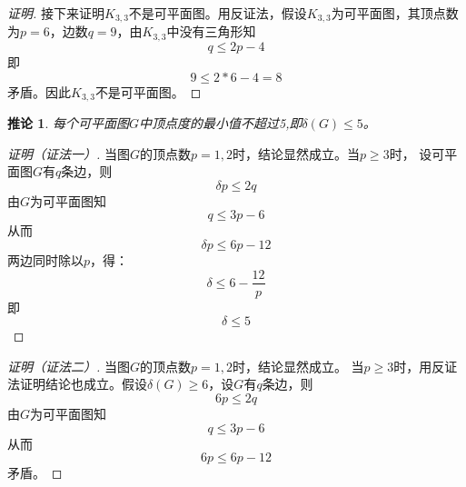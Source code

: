 \documentclass{article}
\newtheorem{Cor}{推论}
\begin{document}
\begin{CJK*}{UTF8}{gbsn}
\begin{proof}[证明]
  接下来证明$K_{3,3}$不是可平面图。用反证法，假设$K_{3,3}$为可平面图，其顶点数为$p=6$，边数$q=9$，由$K_{3,3}$中没有三角形知
  \[q \leq 2p -4\]
  即
  \[9 \leq 2 * 6 - 4 = 8\]
  矛盾。因此$K_{3,3}$不是可平面图。
\end{proof}
  \begin{Cor}
    每个可平面图$G$中顶点度的最小值不超过5,即$\delta (G) \leq 5$。
  \end{Cor}
  \begin{proof}[证明（证法一）]
  当图$G$的顶点数$p=1,2$时，结论显然成立。当$p\geq 3$时，
  设可平面图$G$有$q$条边，则
  \[\delta p \leq 2q\]
  由$G$为可平面图知
  \[q \leq 3p - 6\]
  从而
  \[\delta p \leq 6p - 12\]
  两边同时除以$p$，得：
  \[\delta \leq 6 - \frac{12}{p}\]
  即
  \[\delta \leq 5\]
\end{proof}
\begin{proof}[证明（证法二）]
  当图$G$的顶点数$p=1,2$时，结论显然成立。
  当$p \geq 3$时，用反证法证明结论也成立。假设$\delta (G) \geq 6$，设$G$有$q$条边，则
  \[6p \leq 2q\]
  由$G$为可平面图知
  \[q \leq 3p - 6\]
  从而
  \[6p \leq 6p - 12\]
矛盾。  
\end{proof}


\end{CJK*}
\end{document}
